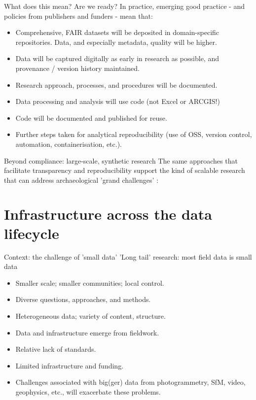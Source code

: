 \documentclass[aspectratio=169, 12pt]{beamer} %
\begin{document}
\begin{frame}{What does this mean? Are we ready?}
  In practice, emerging good practice - and policies from publishers and funders - mean that:
    \begin{itemize}
        \item Comprehensive, FAIR datasets will be deposited in domain-specific repositories. Data, and especially metadata, quality will be higher.
        \item Data will be captured digitally as early in research as possible, and provenance / version history maintained.
        \item Research approach, processes, and procedures will be documented.
        \item Data processing and analysis will use code (not Excel or ARCGIS!) 
        \item Code will be documented and published for reuse.
        \item Further steps taken for analytical reproducibility (use of OSS, version control, automation, containerisation, etc.). 
    \end{itemize}
\end{frame}

\begin{frame}{Beyond compliance: large-scale, synthetic research}
  The same approaches that facilitate transparency and reproducibility support the kind of scalable research that can address archaeological 'grand challenges' \cite{Kintigh2014-u}:
\end{frame}

\section{Infrastructure across the data lifecycle}

\begin{frame}{Context: the challenge of 'small data'}
    'Long tail' research: most field data is small data \cite{Borgman2015-rh}
      \begin{itemize}
        \item Smaller scale; smaller communities; local control.
        \item Diverse questions, approaches, and methods.
        \item Heterogeneous data; variety of content, structure.
        \item Data and infrastructure emerge from fieldwork. 
        \item Relative lack of standards.
        \item Limited infrastructure and funding.
        \item Challenges associated with big(ger) data from photogrammetry, SfM, video, geophysics, etc., will exacerbate these problems.
    \end{itemize}
\end{frame}
\end{document}
